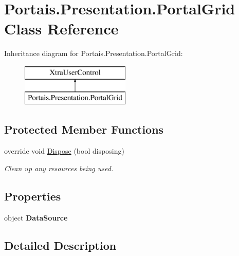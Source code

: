 \hypertarget{class_portais_1_1_presentation_1_1_portal_grid}{}\section{Portais.\+Presentation.\+Portal\+Grid Class Reference}
\label{class_portais_1_1_presentation_1_1_portal_grid}
Inheritance diagram for Portais.\+Presentation.\+Portal\+Grid\+:\begin{figure}[H]
\begin{center}
\leavevmode
\includegraphics[height=2.000000cm]{class_portais_1_1_presentation_1_1_portal_grid}
\end{center}
\end{figure}
\subsection*{Protected Member Functions}
\begin{DoxyCompactItemize}
\item 
override void \hyperlink{class_portais_1_1_presentation_1_1_portal_grid_aa78f92f18c64963a6fd6287d381c1aa4}{Dispose} (bool disposing)
\begin{DoxyCompactList}\small\item\em Clean up any resources being used. \end{DoxyCompactList}\end{DoxyCompactItemize}
\subsection*{Properties}
\begin{DoxyCompactItemize}
\item 
object {\bfseries Data\+Source}\hypertarget{class_portais_1_1_presentation_1_1_portal_grid_a3e9b1b47257da969e66ead32f31fa9a6}{}\label{class_portais_1_1_presentation_1_1_portal_grid_a3e9b1b47257da969e66ead32f31fa9a6}

\end{DoxyCompactItemize}


\subsection{Detailed Description}


